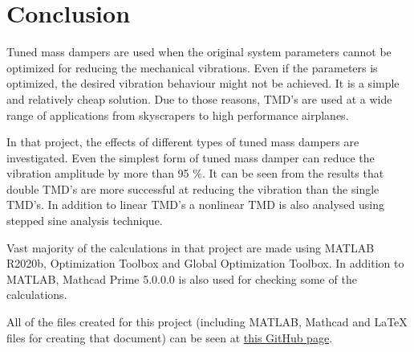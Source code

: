 \section{Conclusion}
Tuned mass dampers are used when the original system parameters cannot be optimized for reducing the mechanical vibrations. Even if the parameters is optimized, the desired vibration behaviour might not be achieved. It is a simple and relatively cheap solution. Due to those reasons, TMD's are used at a wide range of applications from skyscrapers to high performance airplanes.
\par In that project, the effects of different types of tuned mass dampers are investigated. Even the simplest form of tuned mass damper can reduce the vibration amplitude by more than 95 \%. It can be seen from the results that double TMD's are more successful at reducing the vibration than the single TMD's. In addition to linear TMD's a nonlinear TMD is also analysed using stepped sine analysis technique.
\par Vast majority of the calculations in that project are made using MATLAB R2020b, Optimization Toolbox and Global Optimization Toolbox. In addition to MATLAB, Mathcad Prime 5.0.0.0 is also used for checking some of the calculations.
\par All of the files created for this project (including MATLAB, Mathcad and LaTeX files for creating that document) can be seen at \href{https://github.com/mehmetfurkandogan/Tuned-Mass-Damper-Optimization}{this GitHub page}. 